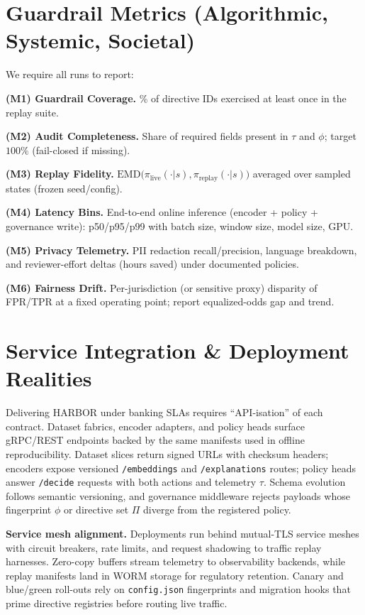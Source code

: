 \documentclass[letterpaper]{article}
\begin{document}
\section{Guardrail Metrics (Algorithmic, Systemic, Societal)}
\label{sec:metrics}
We require all runs to report:

\textbf{(M1) Guardrail Coverage.}
\% of directive IDs exercised at least once in the replay suite.

\textbf{(M2) Audit Completeness.}
Share of required fields present in $\tau$ and $\phi$; target $100\%$ (fail-closed if missing).

\textbf{(M3) Replay Fidelity.}
$\mathrm{EMD}\big(\pi_{\text{live}}(\cdot|s),\pi_{\text{replay}}(\cdot|s)\big)$ averaged over sampled states (frozen seed/config).

\textbf{(M4) Latency Bins.}
End-to-end online inference (encoder + policy + governance write): p50/p95/p99 with batch size, window size, model size, GPU.

\textbf{(M5) Privacy Telemetry.}
PII redaction recall/precision, language breakdown, and reviewer-effort deltas (hours saved) under documented policies.

\textbf{(M6) Fairness Drift.}
Per-jurisdiction (or sensitive proxy) disparity of FPR/TPR at a fixed operating point; report equalized-odds gap and trend.

\section{Service Integration \& Deployment Realities}
\label{sec:service}
Delivering \textsc{HARBOR} under banking SLAs requires ``API-isation'' of each contract. Dataset fabrics, encoder adapters, and policy heads surface gRPC/REST endpoints backed by the same manifests used in offline reproducibility. Dataset slices return signed URLs with checksum headers; encoders expose versioned \texttt{/embeddings} and \texttt{/explanations} routes; policy heads answer \texttt{/decide} requests with both actions and telemetry $\tau$. Schema evolution follows semantic versioning, and governance middleware rejects payloads whose fingerprint $\phi$ or directive set $\Pi$ diverge from the registered policy.

\textbf{Service mesh alignment.}
Deployments run behind mutual-TLS service meshes with circuit breakers, rate limits, and request shadowing to traffic replay harnesses. Zero-copy buffers stream telemetry to observability backends, while replay manifests land in WORM storage for regulatory retention. Canary and blue/green roll-outs rely on \texttt{config.json} fingerprints and migration hooks that prime directive registries before routing live traffic.
\end{document}
